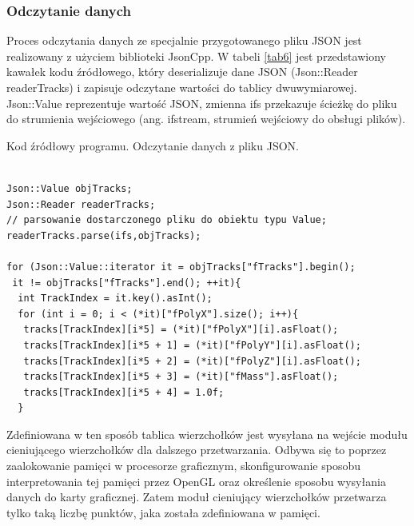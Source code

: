 \subsubsection{Odczytanie danych}
Proces odczytania danych ze specjalnie przygotowanego pliku JSON jest realizowany z użyciem biblioteki JsonCpp. W tabeli \ref{tab6} jest przedstawiony kawałek kodu źródłowego, który deserializuje dane JSON (Json::Reader readerTracks) i zapisuje odczytane wartości do tablicy dwuwymiarowej. Json::Value reprezentuje wartość JSON, zmienna ifs przekazuje ścieżkę do pliku do strumienia wejściowego (ang. ifstream, strumień wejściowy do obsługi plików).
\begin{table}[H]
\caption{Kod źródłowy programu. Odczytanie danych z pliku JSON.}
\label{tab6}
\begin{lstlisting}[frame=single]  % Start your code-block

Json::Value objTracks; 
Json::Reader readerTracks; 
// parsowanie dostarczonego pliku do obiektu typu Value;
readerTracks.parse(ifs,objTracks); 

for (Json::Value::iterator it = objTracks["fTracks"].begin(); 
 it != objTracks["fTracks"].end(); ++it){
  int TrackIndex = it.key().asInt();
  for (int i = 0; i < (*it)["fPolyX"].size(); i++){
   tracks[TrackIndex][i*5] = (*it)["fPolyX"][i].asFloat();
   tracks[TrackIndex][i*5 + 1] = (*it)["fPolyY"][i].asFloat();
   tracks[TrackIndex][i*5 + 2] = (*it)["fPolyZ"][i].asFloat();
   tracks[TrackIndex][i*5 + 3] = (*it)["fMass"].asFloat();
   tracks[TrackIndex][i*5 + 4] = 1.0f;
  }
\end{lstlisting}
\end{table}
Zdefiniowana w ten sposób tablica wierzchołków jest wysyłana na wejście modułu cieniującego wierzchołków dla dalszego przetwarzania. Odbywa się to poprzez zaalokowanie pamięci w procesorze graficznym, skonfigurowanie sposobu interpretowania tej pamięci przez OpenGL oraz określenie sposobu wysyłania danych do karty graficznej. Zatem moduł cieniujący wierzchołków przetwarza tylko taką liczbę punktów, jaka została zdefiniowana w pamięci.

